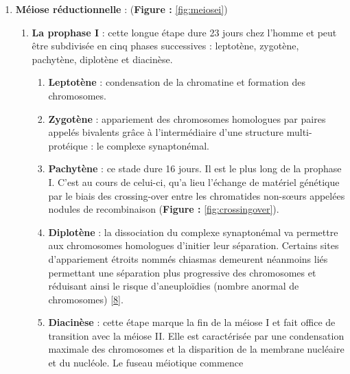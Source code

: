 \documentclass[12pt,twoside]{reedthesis}
\providecommand{\tightlist}{%
  \setlength{\itemsep}{0pt}\setlength{\parskip}{0pt}}
\theoremstyle{definition}
\theoremstyle{definition}
\theoremstyle{remark}
\begin{document}
  \newpage
  
  \begin{enumerate}
  \def\labelenumi{\arabic{enumi}.}
  \tightlist
  \item
    \textbf{Méiose réductionnelle} : (\textbf{Figure : }\ref{fig:meiosei})
  
    \begin{enumerate}
    \def\labelenumii{\alph{enumii}.}
    \item
      \textbf{La prophase I} : cette longue étape dure 23 jours chez
      l'homme et peut être subdivisée en cinq phases successives :
      leptotène, zygotène, pachytène, diplotène et diacinèse.
  
      \begin{enumerate}
      \def\labelenumiii{\roman{enumiii}.}
      \tightlist
      \item
        \textbf{Leptotène} : condensation de la chromatine et formation
        des chromosomes.\\
      \item
        \textbf{Zygotène} : appariement des chromosomes homologues par
        paires appelés bivalents grâce à l'intermédiaire d'une structure
        multi-protéique : le complexe synaptonémal.\\
      \item
        \textbf{Pachytène} : ce stade dure 16 jours. Il est le plus long
        de la prophase I. C'est au cours de celui-ci, qu'a lieu l'échange
        de matériel génétique par le biais des crossing-over entre les
        chromatides non-sœurs appelées nodules de recombinaison
        (\textbf{Figure : }\ref{fig:crossingover}).\\
      \item
        \textbf{Diplotène} : la dissociation du complexe synaptonémal va
        permettre aux chromosomes homologues d'initier leur séparation.
        Certains sites d'appariement étroits nommés chiasmas demeurent
        néanmoins liés permettant une séparation plus progressive des
        chromosomes et réduisant ainsi le risque d'aneuploïdies (nombre
        anormal de chromosomes)
        {[}\protect\hyperlink{ref-Handyside2012}{8}{]}.\\
      \item
        \textbf{Diacinèse} : cette étape marque la fin de la méiose I et
        fait office de transition avec la méiose II. Elle est caractérisée
        par une condensation maximale des chromosomes et la disparition de
        la membrane nucléaire et du nucléole. Le fuseau méiotique commence

\end{enumerate}
\end{enumerate}
\end{enumerate}
\end{document}
